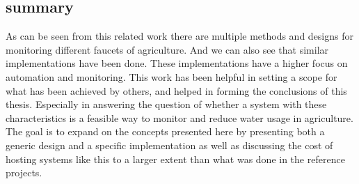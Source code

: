 \documentclass[]{uiophd}
\begin{document}
\subsection{summary}
As can be seen from this related work there are multiple methods and designs for monitoring different faucets of agriculture. And we can also see that similar implementations have been done. These implementations have a higher focus on automation and monitoring. This work has been helpful in setting a scope for what has been achieved by others, and helped in forming the conclusions of this thesis. Especially in answering the question of whether a system with these characteristics is a feasible way to monitor and reduce water usage in agriculture. The goal is to expand on the concepts presented here by presenting both a generic design and a specific implementation as well as discussing the cost of hosting systems like this to a larger extent than what was done in the reference projects.
\end{document}
